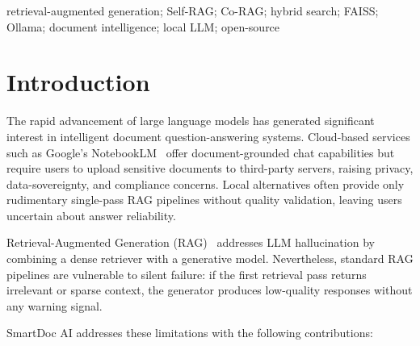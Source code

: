 \documentclass[10pt, conference, a4paper, compsocconf]{IEEEtran}
\begin{document}
\begin{IEEEkeywords}
retrieval-augmented generation; Self-RAG; Co-RAG; hybrid search;
FAISS; Ollama; document intelligence; local LLM; open-source
\end{IEEEkeywords}

\IEEEpeerreviewmaketitle


\section{Introduction}

The rapid advancement of large language models has generated significant
interest in intelligent document question-answering systems. Cloud-based
services such as Google's NotebookLM~\cite{notebooklm} offer document-grounded
chat capabilities but require users to upload sensitive documents to
third-party servers, raising privacy, data-sovereignty, and compliance
concerns. Local alternatives often provide only rudimentary single-pass
RAG pipelines without quality validation, leaving users uncertain about
answer reliability.

Retrieval-Augmented Generation (RAG)~\cite{rag_lewis2020} addresses LLM
hallucination by combining a dense retriever with a generative model.
Nevertheless, standard RAG pipelines are vulnerable to silent failure:
if the first retrieval pass returns irrelevant or sparse context, the
generator produces low-quality responses without any warning signal.

SmartDoc AI addresses these limitations with the following contributions:
\end{document}

